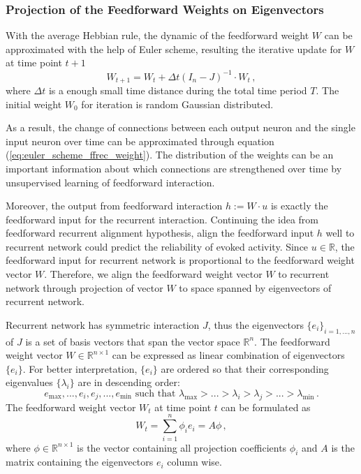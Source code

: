 \documentclass[11pt]{article}
\begin{document}
{	\subsubsection{Projection of the Feedforward Weights on Eigenvectors}
	With the average Hebbian rule, the dynamic of the feedforward weight $W$ can be approximated with the help of Euler scheme, resulting the iterative update for $W$ at time point $t+1$
		\begin{equation} \label{eq:euler_scheme_ffrec_weight}
			W_{t+1} = W_t + \Delta t (I_n - J)^{-1} \cdot W_t \, , 
		\end{equation}
	where $\Delta t$ is a enough small time distance during the total time period $T$. The initial weight $W_0$ for iteration is random Gaussian distributed.
	
	As a result, the change of connections between each output neuron and the single input neuron over time can be approximated through equation (\ref{eq:euler_scheme_ffrec_weight}). The distribution of the weights can be an important information about which connections are strengthened over time by unsupervised learning of feedforward interaction. 
	
	Moreover, the output from feedforward interaction $h := W \cdot u$ is exactly the feedforward input for the recurrent interaction.  Continuing the idea from feedforward recurrent alignment hypothesis, align the feedforward input $h$ well to recurrent network could predict the reliability of evoked activity. Since $u \in \mathbb{R}$, the feedforward input for recurrent network is proportional to the feedforward weight vector $W$. Therefore, we align the feedforward weight vector $W$ to recurrent network through projection of vector $W$ to space spanned by eigenvectors of recurrent network. 
	
	Recurrent network has symmetric interaction $J$, thus the eigenvectors $\{e_i\}_{i = 1, ..., n}$ of $J$ is a set of basis vectors that span the vector space $\mathbb{R}^n$. The feedforward weight vector $W \in \mathbb{R}^{n \times 1}$ can be expressed as linear combination of eigenvectors $\{e_i\}$. For better interpretation, $\{e_i\}$ are ordered so that their corresponding eigenvalues $\{\lambda_i\}$ are in descending order:
		\begin{equation}
			e_{\text{max}}, ..., e_i, e_j, ..., e_{\text{min}} \, \, \text{such that} \, \, \lambda_{\text{max}} > ...> \lambda_i > \lambda_j > ... > \lambda_{\text{min}} \, .
		\end{equation} 
	The feedforward weight vector $W_t$ at time point $t$ can be formulated as
		\begin{equation} \label{eq:linear_combi_weight}
			W_t = \sum_{i = 1}^{n} \phi_i e_i = A \phi \, ,
		\end{equation}
	where $\phi \in \mathbb{R}^{n \times 1}$ is the vector containing all projection coefficients $\phi_i$ and $A$ is the matrix containing the eigenvectors $e_i$ column wise.  
	
}
\end{document}

